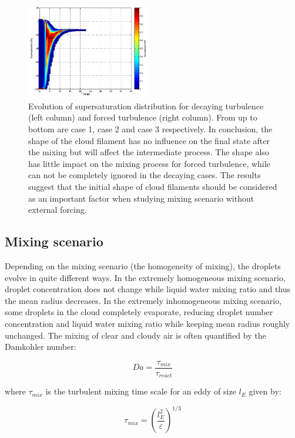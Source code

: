 \begin{figure}[h]
\includegraphics[width=0.48\textwidth]{Figures/pdf_supersat_f3}
\caption{Evolution of supersaturation distribution for decaying turbulence
(left column) and forced turbulence (right column). From up to bottom are case
1, case 2 and case 3 respectively. In conclusion, the shape of the cloud
filament has no influence on the final state after the mixing but will affect
the intermediate process. The shape also has little impact on the mixing
process for forced turbulence, while can not be completely ignored in the
decaying cases. The results suggest that the initial shape of cloud filaments
should be considered as an important factor when studying mixing scenario
without external forcing.}\label{fig:supersat_distri} \end{figure}

\subsection{Mixing scenario}\label{mixing_processes} Depending on the mixing
scenario (the homogeneity of mixing), the droplets evolve in quite different
ways. In the extremely homogeneous mixing scenario, droplet concentration does
not change while liquid water mixing ratio and thus the mean radius decreases.
In the extremely inhomogeneous mixing scenario, some droplets in the cloud
completely evaporate, reducing droplet number concentration and liquid water
mixing ratio while keeping mean radius roughly unchanged. The mixing of clear
and cloudy air is often quantified by the Damkohler number:

\begin{equation}
Da=\frac{\tau_{mix}}{\tau_{react}}\label{eq:DaNumber}
\end{equation}

where $\tau_{mix}$ is the turbulent mixing time scale for an eddy of size $l_E$ given by:

\begin{equation}
\tau_{mix}=(\frac{l_E^{2}}{\varepsilon})^{1/3}\label{eq:Tmix}
\end{equation}

